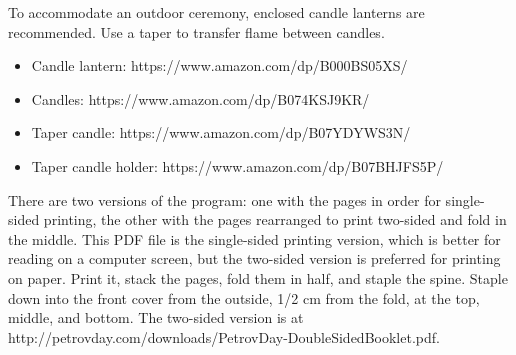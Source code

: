 \documentclass{article}
\begin{document}
To accommodate an outdoor ceremony, enclosed candle lanterns are recommended.
Use a taper to transfer flame between candles.

\begin{itemize} \itemsep0pt \parskip0pt 
	\item Candle lantern: https://www.amazon.com/dp/B000BS05XS/
	\item Candles: https://www.amazon.com/dp/B074KSJ9KR/
	\item Taper candle: https://www.amazon.com/dp/B07YDYWS3N/
	\item Taper candle holder: https://www.amazon.com/dp/B07BHJFS5P/
\end{itemize}

There are two versions of the program: one with the pages in order for
single-sided printing, the other with the pages rearranged to print two-sided
and fold in the middle. This PDF file is the single-sided printing version,
which is better for reading on a computer screen, but the two-sided version is
preferred for printing on paper. Print it, stack the pages, fold them in half,
and staple the spine. Staple down into the front cover from the outside, 1/2
cm from the fold, at the top, middle, and bottom. The two-sided version is at
http://petrovday.com/downloads/PetrovDay-DoubleSidedBooklet.pdf{}.
\end{document}
